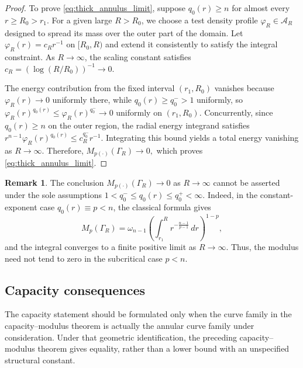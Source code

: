 \documentclass[12pt]{amsart}
\numberwithin{equation}{section}
\theoremstyle{plain}
\theoremstyle{definition}
\newtheorem{remark}[equation]{Remark}
\begin{document}
\begin{proof}
To prove \eqref{eq:thick_annulus_limit}, suppose $q_0(r) \ge n$ for almost every $r \ge R_0 > r_1$. For a given large $R > R_0$, we choose a test density profile $\varphi_R \in \mathcal{A}_R$ designed to spread its mass over the outer part of the domain. Let $\varphi_R(r) = c_R r^{-1}$ on $[R_0, R)$ and extend it consistently to satisfy the integral constraint. As $R \to \infty$, the scaling constant satisfies $c_R = (\log(R/R_0))^{-1} \to 0$.

The energy contribution from the fixed interval $(r_1,R_0)$ vanishes because $\varphi_R(r)\to0$ uniformly there, while $q_0(r)\ge q_0^->1$ uniformly, so $\varphi_R(r)^{q_0(r)} \le \varphi_R(r)^{q_0^-} \to 0$ uniformly on $(r_1,R_0)$. Concurrently, since $q_0(r) \ge n$ on the outer region, the radial energy integrand satisfies $r^{n-1}\varphi_R(r)^{q_0(r)} \le c_R^{q_0^-} r^{-1}$. Integrating this bound yields a total energy vanishing as $R \to \infty$. Therefore, $M_{p(\cdot)}(\Gamma_R)\longrightarrow0,$ which proves \eqref{eq:thick_annulus_limit}.
\end{proof}

\begin{remark}
The conclusion $M_{p(\cdot)}(\Gamma_R)\to0$ as $R\to\infty$ cannot be asserted under the sole assumptions $1<q_0^-\le q_0(r)\le q_0^+<\infty.$ Indeed, in the constant-exponent case $q_0(r)\equiv p<n$, the classical formula gives
\begin{equation*}
M_p(\Gamma_R) = \omega_{n-1} \left( \int_{r_1}^{R} r^{-\frac{n-1}{p-1}}\,dr \right)^{1-p},
\end{equation*}
and the integral converges to a finite positive limit as $R\to\infty$. Thus, the modulus need not tend to zero in the subcritical case $p<n$.
\end{remark}


\subsection{Capacity consequences}

The capacity statement should be formulated only when the curve family in the capacity--modulus theorem is actually the annular curve family under consideration. Under that geometric identification, the preceding capacity--modulus theorem gives equality, rather than a lower bound with an unspecified structural constant.
\end{document}
